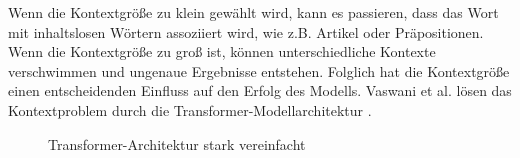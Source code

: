 \documentclass[12pt,letterpaper,ngerman]{article}
\begin{document}
Wenn die Kontextgröße zu klein gewählt wird, kann es passieren, dass 
das Wort mit inhaltslosen Wörtern assoziiert wird, wie z.B. Artikel 
oder Präpositionen. Wenn die Kontextgröße zu groß ist, können 
unterschiedliche Kontexte verschwimmen und ungenaue Ergebnisse entstehen.
Folglich hat die Kontextgröße einen entscheidenden Einfluss auf den Erfolg 
des Modells. Vaswani et al. lösen das Kontextproblem 
durch die Transformer-Modellarchitektur \cite{transformer}.
\begin{figure}
  \begin{center}
  \end{center}
  \caption{Transformer-Architektur stark vereinfacht}
\end{figure}
\end{document}
